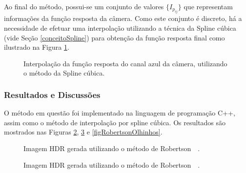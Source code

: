 Ao final do método, possui-se um conjunto de valores $\{I_{p_{ij}}\}$ que representam informações da função resposta da câmera. Como este conjunto é discreto, há a necessidade de efetuar uma interpolação utilizando a técnica da Spline cúbica (vide Seção \ref{conceitoSpline}) para obtenção da função resposta final como ilustrado na Figura \ref{figRobertsonPontos}. 

\begin{figure}[H]
  \centering
  \quad %
  \caption{Interpolação da função resposta do canal azul da câmera, utilizando o método da Spline cúbica.}
  \label{figRobertsonPontos}
\end{figure}

\subsubsection{Resultados e Discussões} \label{metodoRobertsonResultado}

O método em questão foi implementado na linguagem de programação C++, assim como o método de interpolação por spline cúbica. Os resultados são mostrados nas Figuras \ref{figRobertsonDidatica}, \ref{figRobertsonPorquinho} e \ref{figRobertsonOlhinhos}.

\begin{figure}[H]
  \centering
  \quad %
  \caption{Imagem HDR gerada utilizando o método de Robertson~\etal~\protect\cite{robertson}.}
  \label{figRobertsonDidatica}
\end{figure}

\begin{figure}[H]
  \centering
  \quad %
  \quad %
  \caption{Imagem HDR gerada utilizando o método de Robertson~\etal~\protect\cite{robertson}.}
  \label{figRobertsonPorquinho}
\end{figure}


